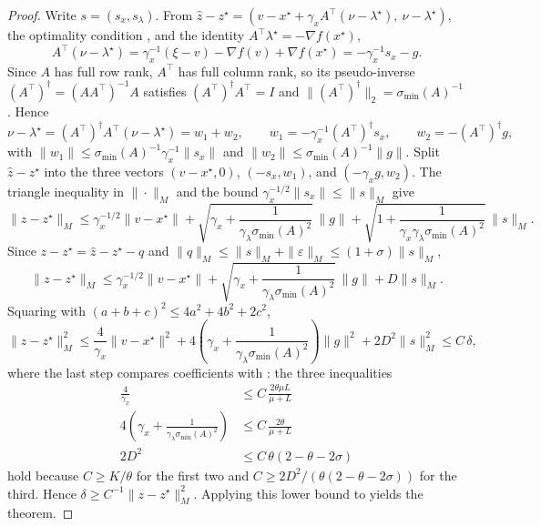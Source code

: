 \documentclass[11pt]{article}
\begin{document}
\begin{proof}
    Write $s = (s_x, s_\lambda)$.
    From $\hat{z} - z^\star = (v - x^\star + \gamma_x A^\top(\nu - \lambda^\star),\ \nu - \lambda^\star)$, the optimality condition , and the identity $A^\top\lambda^\star = -\nabla f(x^\star)$,
    \begin{equation*}
        A^\top(\nu - \lambda^\star) = \gamma_x^{-1}(\xi - v) - \nabla f(v) + \nabla f(x^\star) = -\gamma_x^{-1} s_x - g.
    \end{equation*}
    Since $A$ has full row rank, $A^\top$ has full column rank, so its pseudo-inverse $(A^\top)^\dagger = (AA^\top)^{-1}A$ satisfies $(A^\top)^\dagger A^\top = I$ and $\|(A^\top)^\dagger\|_2 = \sigma_{\min}(A)^{-1}$.
    Hence
    \begin{equation*}
        \nu - \lambda^\star = (A^\top)^\dagger A^\top(\nu - \lambda^\star) = w_1 + w_2, \qquad w_1 = -\gamma_x^{-1}(A^\top)^\dagger s_x, \qquad w_2 = -(A^\top)^\dagger g,
    \end{equation*}
    with $\|w_1\| \leq \sigma_{\min}(A)^{-1}\gamma_x^{-1}\|s_x\|$ and $\|w_2\| \leq \sigma_{\min}(A)^{-1}\|g\|$.
    Split $\hat z - z^\star$ into the three vectors $(v - x^\star, 0)$, $(-s_x, w_1)$, and $(-\gamma_x g, w_2)$.
    The triangle inequality in $\|\cdot\|_M$ and the bound $\gamma_x^{-1/2}\|s_x\| \leq \|s\|_M$ give
    \begin{equation*}
        \|\hat z - z^\star\|_M \leq \gamma_x^{-1/2}\|v - x^\star\| + \sqrt{\gamma_x + \frac{1}{\gamma_\lambda\sigma_{\min}(A)^2}}\,\|g\| + \sqrt{1 + \frac{1}{\gamma_x\gamma_\lambda\sigma_{\min}(A)^2}}\,\|s\|_M.
    \end{equation*}
    Since $z - z^\star = \hat z - z^\star - q$ and $\|q\|_M \leq \|s\|_M + \|\varepsilon\|_M \leq (1 + \sigma)\|s\|_M$,
    \begin{equation}\label{eq:lyapunov-bound}
        \|z - z^\star\|_M \leq \gamma_x^{-1/2}\|v - x^\star\| + \sqrt{\gamma_x + \frac{1}{\gamma_\lambda\sigma_{\min}(A)^2}}\,\|g\| + D\|s\|_M.
    \end{equation}
    Squaring with $(a + b + c)^2 \leq 4a^2 + 4b^2 + 2c^2$,
    \begin{equation*}
        \|z - z^\star\|_M^2 \leq \frac{4}{\gamma_x}\|v - x^\star\|^2 + 4\left(\gamma_x + \frac{1}{\gamma_\lambda\sigma_{\min}(A)^2}\right)\|g\|^2 + 2D^2\|s\|_M^2 \leq C\,\delta,
    \end{equation*}
    where the last step compares coefficients with : the three inequalities
    \begin{align*}
        \frac{4}{\gamma_x} &\leq C\,\frac{2\theta\mu L}{\mu + L} \\
        4\left(\gamma_x + \frac{1}{\gamma_\lambda\sigma_{\min}(A)^2}\right) &\leq C\,\frac{2\theta}{\mu + L} \\
        2D^2 &\leq C\,\theta(2 - \theta - 2\sigma)
    \end{align*}
    hold because $C \geq K/\theta$ for the first two and $C \geq 2D^2/(\theta(2-\theta-2\sigma))$ for the third.
    Hence $\delta \geq C^{-1}\|z - z^\star\|_M^2$.
    Applying this lower bound to  yields the theorem.
\end{proof}
\end{document}
